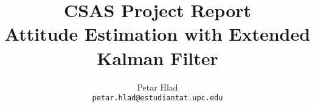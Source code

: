 \documentclass[12pt,a4paper,twoside,openright]{article}
\begin{document}
\title{CSAS Project Report \\ Attitude Estimation with Extended Kalman Filter}
\author{Petar Hlad \\
\texttt{petar.hlad@estudiantat.upc.edu}}

\maketitle

    
    
    
    
    
    
    
    
    



\end{document}
